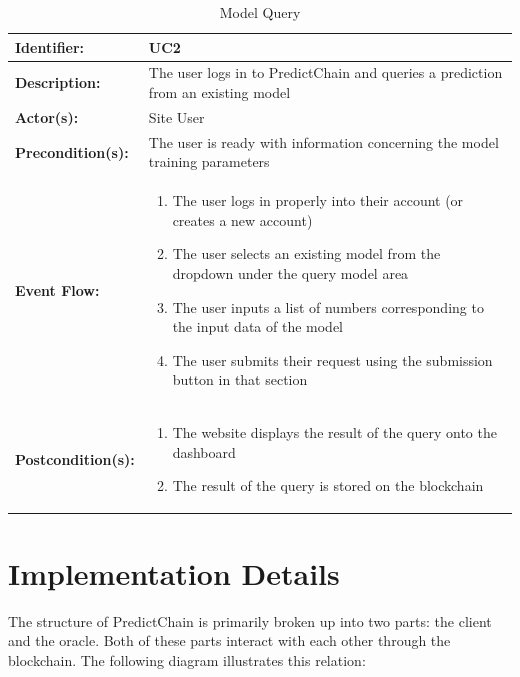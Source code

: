 \documentclass{ledger}
\begin{document}
\begin{table}[H]
    \caption{Model Query}
    \label{tab:model-query}
    \centering
    \begin{tabular}{|p{3cm}|p{11cm}|}
        \hline
        \textbf{Identifier:} & UC2 \\
        \hline
        \textbf{Description:} & The user logs in to PredictChain and queries a prediction from an existing model\\
        \hline
        \textbf{Actor(s):} & Site User \\
        \hline
        \textbf{Precondition(s):} & The user is ready with information concerning the model training parameters \\
        \hline
        \textbf{Event Flow:} &
        \begin{enumerate}
            \item The user logs in properly into their account (or creates a new account)
            \item The user selects an existing model from the dropdown under the query model area
            \item The user inputs a list of numbers corresponding to the input data of the model
            \item The user submits their request using the submission button in that section
        \end{enumerate} \\
        \hline
        \textbf{Postcondition(s):} &
        \begin{enumerate}
            \item The website displays the result of the query onto the dashboard
            \item The result of the query is stored on the blockchain
        \end{enumerate}\\
        \hline
    \end{tabular}
\end{table}

\section{Implementation Details}

The structure of PredictChain is primarily broken up into two parts: the client and the oracle.  Both of these parts
interact with each other through the blockchain.  The following diagram illustrates this relation:
\end{document}
